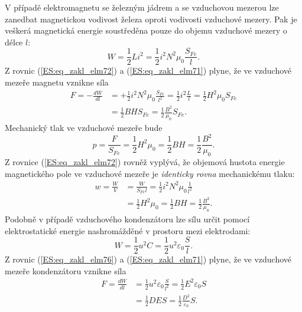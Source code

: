       V případě elektromagnetu se železným jádrem a se vzduchovou mezerou lze zanedbat magnetickou 
      vodivost železa oproti vodivosti vzduchové mezery. Pak je veškerá magnetická energie 
      soustředěna pouze do objemu vzduchové mezery o délce \(l\):
      \begin{equation}\label{ES:eq_zakl_elm72}
        W =\frac{1}{2}Li^2 = \frac{1}{2}i^2N^2\mu_0\frac{S_{Fe}}{l}.
      \end{equation}
      Z rovnic (\ref{ES:eq_zakl_elm72}) a (\ref{ES:eq_zakl_elm71}) plyne, že ve vzduchové mezeře 
      magnetu vznikne síla
      \begin{align}\label{ES:eq_zakl_elm73}
         F = -\frac{dW}{dl} 
           &= +\frac{1}{2}i^2N^2\mu_0\frac{S_{Fe}}{l^2}
           =  \frac{1}{2}i^2\frac{L}{l} = \frac{1}{2}H^2\mu_0S_{Fe}              \nonumber \\
           &=  \frac{1}{2}BHS_{Fe} = \frac{1}{2}\frac{B^2}{\mu_0}S_{Fe}.
      \end{align}
      Mechanický tlak ve vzduchové mezeře bude
      \begin{equation}\label{ES:eq_zakl_elm74}
        p = \frac{F}{S_{Fe}} = \frac{1}{2}H^2\mu_0 = \frac{1}{2}BH = \frac{1}{2}\frac{B^2}{\mu_0}.
      \end{equation}
      Z rovnice (\ref{ES:eq_zakl_elm72}) rovněž vyplývá, že objemová hustota energie magnetického 
      pole ve vzduchové mezeře je \emph{identicky rovna} mechanickému tlaku:
      \begin{align}\label{ES:eq_zakl_elm75}
        w  = \frac{W}{V} 
          &= \frac{W}{S_{Fe}l} = \frac{1}{2}i^2N^2\mu_0\frac{1}{l^2}             \nonumber \\
          &= \frac{1}{2}H^2\mu_0 = \frac{1}{2}BH = \frac{1}{2}\frac{B^2}{\mu_0}.
      \end{align}
      Podobně v případě vzduchového kondenzátoru lze sílu určit pomocí elektrostatické energie 
      nashromážděné v prostoru mezi elektrodami:
      \begin{equation}\label{ES:eq_zakl_elm76}
        W = \frac{1}{2}u^2C = \frac{1}{2}u^2\varepsilon_0\frac{S}{l}.
      \end{equation}
      Z rovnic (\ref{ES:eq_zakl_elm76}) a (\ref{ES:eq_zakl_elm71}) plyne, že ve vzduchové mezeře 
      kondenzátoru vznikne síla
      \begin{align}\label{ES:eq_zakl_elm77}
        F  = \frac{dW}{dl} 
          &= \frac{1}{2}u^2\varepsilon_0\frac{S}{l^2}
           = \frac{1}{2}E^2\varepsilon_0S                                 \nonumber \\
          &= \frac{1}{2}DES           
           = \frac{1}{2}\frac{D^2}{\varepsilon_0}S.
      \end{align}
